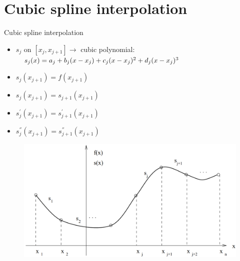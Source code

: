 \section{Cubic spline interpolation}
	\begin{frame}{Cubic spline interpolation}
		\begin{block}{}
			\begin{itemize}
				\item $s_{j}$ on $[x_{j},x_{j+1}] \rightarrow$ cubic polynomial:
                $\newline \ \ \ s_{j}(x)=a_{j}+b_{j}(x-x_{j})+c_{j}(x-x_{j})^{2}+
                d_{j}(x-x_{j})^{3}$
                \item $s_{j}(x_{j+1})=f(x_{j+1})$
                \item $s_{j}(x_{j+1})=s_{j+1}(x_{j+1})$
                \item $s^{'}_{j}(x_{j+1})=s^{'}_{j+1}(x_{j+1})$
                \item $s^{''}_{j}(x_{j+1})=s^{''}_{j+1}(x_{j+1})$
			\end{itemize}
		\end{block}
        \begin{figure}[h]
			\includegraphics[width=.55\linewidth]{img/4/spline_img_4}
		\end{figure}
	\end{frame}
